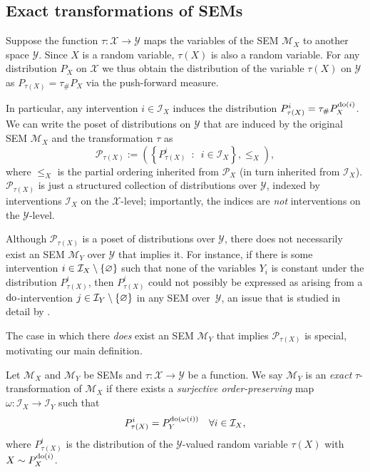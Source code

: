 \subsection{Exact transformations of SEMs}

Suppose the function ${\tau: \mathcal{X} \to \mathcal{Y}}$ maps the variables of the SEM $\mathcal{M}_X$ to another space $\mathcal{Y}$.
Since $X$ is a random variable, $\tau(X)$ is also a random variable.
For any distribution $P_X$ on $\mathcal{X}$ we thus obtain the distribution of the variable $\tau(X)$ on $\mathcal{Y}$ as $P_{\tau(X)} = \tau_{\#}P_X$ via the push-forward measure. 


In particular, any intervention $i \in \mathcal{I}_X$ induces the distribution $P_{\tau(X)}^{i} = \tau_{\#}P_X^{\operatorname{do}(i)}$.
We can write the poset of distributions on $\mathcal{Y}$ that are induced by the original SEM $\mathcal{M}_X$ and the transformation $\tau$ as
\[\mathcal{P}_{\tau(X)} := \left( \left\{ P_{\tau(X)}^{i} \enspace : \enspace i \in \mathcal{I}_X \right\}, \leq_X \right), \]
where $\leq_X$ is the partial ordering inherited from $\mathcal{P}_X$ (in turn inherited from $\mathcal{I}_X$).
$\mathcal{P}_{\tau(X)}$ is just a structured collection of distributions over $\mathcal{Y}$, indexed by interventions $\mathcal{I}_X$ on the $\mathcal{X}$-level; importantly, the indices are \emph{not} interventions on the $\mathcal{Y}$-level.



Although $\mathcal{P}_{\tau(X)}$ is a poset of distributions over $\mathcal{Y}$, there does not necessarily exist an SEM $\mathcal{M}_Y$ over $\mathcal{Y}$ that implies it.
For instance, if there is some intervention ${i \in \mathcal{I}_X \setminus \{ \varnothing \}}$ such that none of the variables $Y_i$ is constant under the distribution $P_{\tau(X)}^{i}$, then $P_{\tau(X)}^{i}$ could not possibly be expressed as arising from a $\operatorname{do}$-intervention $j\in \mathcal{I}_Y \setminus \{\varnothing\}$ in any SEM over~$\mathcal{Y}$, an issue that is studied in detail by \cite{eberhardt2016green}.

The case in which there \emph{does} exist an SEM $\mathcal{M}_Y$ that implies $\mathcal{P}_{\tau(X)}$ is special, motivating our main definition.

\medskip

\begin{definition}\label{def:exacttrafos}
Let $\mathcal{M}_X$ and $\mathcal{M}_Y$ be SEMs and $\tau: \mathcal{X} \to \mathcal{Y}$ be a function.
We say $\mathcal{M}_Y$ is an \emph{exact}  $\tau$-transformation of $\mathcal{M}_X$ if there exists a \emph{surjective order-preserving} map $\omega:\mathcal{I}_X\rightarrow \mathcal{I}_Y$ such that
\[ P_{\tau(X)}^{i} = P_Y^{\operatorname{do}(\omega(i))} \quad \forall i \in \mathcal{I}_X, \]
where $P_{\tau(X)}^{i}$ is the distribution of the $\mathcal{Y}$-valued random variable $\tau(X)$ with $X \sim P_X^{\operatorname{do}(i)}$.
\end{definition}

